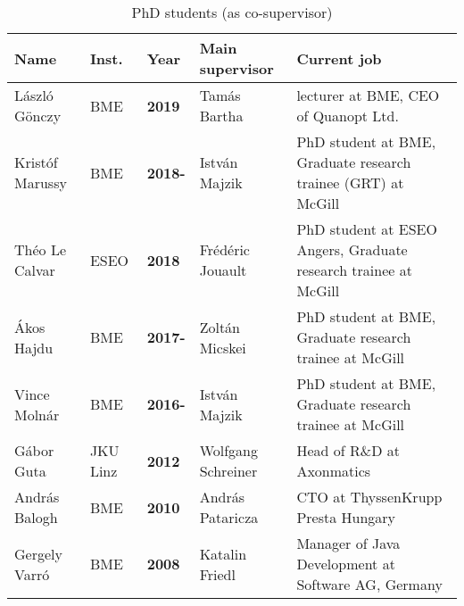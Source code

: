 \begin{table}[htb]
\footnotesize
\begin{tabular}{@{}lllp{3cm}p{7cm}@{}}
\toprule
\textbf{Name} & \textbf{Inst.} & \textbf{Year} & \textbf{Main supervisor} & \textbf{Current job} \\ \midrule
L\'aszl\'o G\"onczy & BME & \textbf{2019}  & Tam\'as Bartha & lecturer at BME, CEO of Quanopt Ltd.\\
Krist\'of Marussy & BME & \textbf{2018-}  & Istv\'an Majzik & PhD student at BME, Graduate research trainee (GRT) at McGill \\
Th\'eo Le Calvar & ESEO & \textbf{2018}  & Fr\'ed\'eric Jouault & PhD student at ESEO Angers, Graduate research trainee at McGill \\
\'Akos Hajdu & BME & \textbf{2017-}  & Zolt\'an Micskei & PhD student at BME, Graduate research trainee at McGill \\
Vince Moln\'ar & BME & \textbf{2016-}  & Istv\'an Majzik & PhD student at BME, Graduate research trainee at McGill \\
G\'abor Guta & JKU Linz & \textbf{2012}  & Wolfgang Schreiner & Head of R\&D at Axonmatics \\
Andr\'as Balogh & BME & \textbf{2010}  & Andr\'as Pataricza & CTO at ThyssenKrupp Presta Hungary \\
Gergely Varr\'o & BME & \textbf{2008}  & Katalin Friedl & Manager of Java Development at Software AG, Germany \\ \bottomrule
\end{tabular}
\caption{PhD students (as co-supervisor)}
\label{tab:phd-cosupervised}
\end{table}

